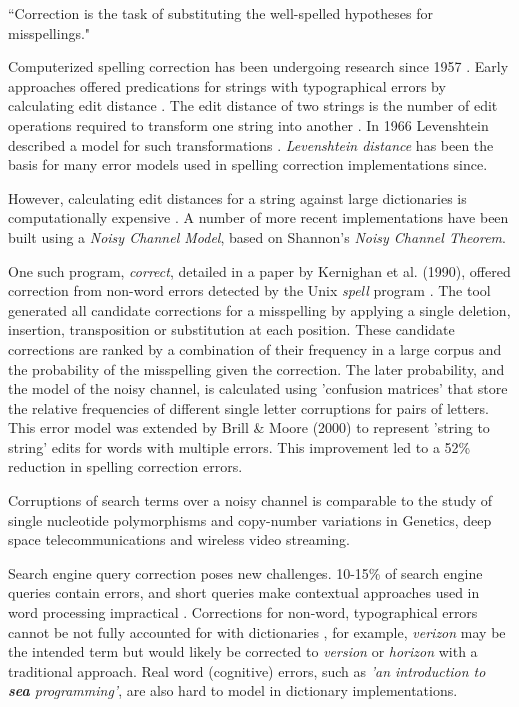 \documentclass{csfourzero}
\begin{document}
``Correction is the task of substituting the well-spelled hypotheses for misspellings." \cite{webuser4google2009}

Computerized spelling correction has been undergoing research since 1957 \cite{jameslpeterson1980beginning}. Early approaches offered predications for strings with typographical errors by calculating edit distance \cite{1992correctiondiscussion}. The edit distance of two strings is the number of edit operations required to transform one string into another \cite{introIR}. In 1966 Levenshtein described a model for such transformations \cite{levenshtein1966binary}. \textit{Levenshtein distance} has been the basis for many error models used in spelling correction implementations since.

However, calculating edit distances for a string against large dictionaries is computationally expensive \cite{2009adaptivespellchecker}. A number of more recent implementations have been built using a \textit{Noisy Channel Model}, based on Shannon's \textit{Noisy Channel Theorem}.

One such program, \textit{correct}, detailed in a paper by Kernighan et al. (1990), offered correction from non-word errors detected by the Unix \textit{spell} program \cite{originalnoisychannel}. The tool generated all candidate corrections for a misspelling by applying a single deletion, insertion, transposition or substitution at each position. These candidate corrections are ranked by a combination of their frequency in a large corpus and the probability of the misspelling given the correction. The later probability, and the model of the noisy channel, is calculated using 'confusion matrices' that store the relative frequencies of different single letter corruptions for pairs of letters. This error model was extended by Brill \& Moore (2000) \cite{betternoisychannel} to represent 'string to string' edits for words with multiple errors. This improvement led to a 52\% reduction in spelling correction errors.

Corruptions of search terms over a noisy channel is comparable to the study of single nucleotide polymorphisms and copy-number variations in Genetics, deep space telecommunications and wireless video streaming.

Search engine query correction poses new challenges. 10-15\% of search engine queries contain errors, and short queries make contextual approaches used in word processing impractical \cite{webuserpoweredspelling}. Corrections for non-word, typographical errors cannot be not fully accounted for with dictionaries \cite{webuser3}, for example, \textit{verizon} may be the intended term but would likely be corrected to \textit{version} or \textit{horizon} with a traditional approach. Real word (cognitive) errors, such as \textit{'an introduction to \textbf{sea} programming'}, are also hard to model in dictionary implementations.
\end{document}
